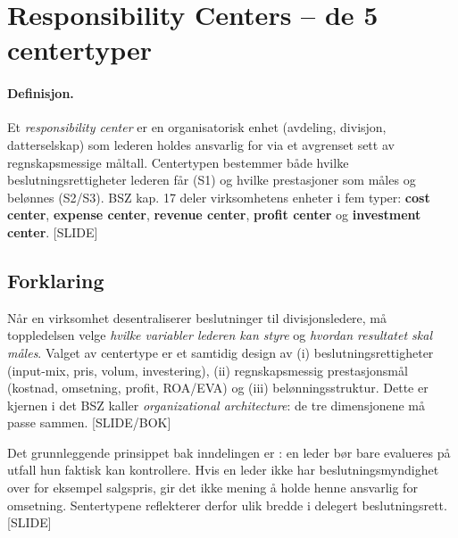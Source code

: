 \section{Responsibility Centers -- de 5 centertyper}\label{thr:responsibility-centers}

\paragraph{Definisjon.} Et \emph{responsibility center} er en organisatorisk enhet (avdeling, divisjon, datterselskap) som lederen holdes ansvarlig for via et avgrenset sett av regnskapsmessige måltall. Centertypen bestemmer både hvilke beslutningsrettigheter lederen får (S1) og hvilke prestasjoner som måles og belønnes (S2/S3). BSZ kap. 17 deler virksomhetens enheter i fem typer: \textbf{cost center}, \textbf{expense center}, \textbf{revenue center}, \textbf{profit center} og \textbf{investment center}. [SLIDE]

\subsection*{Forklaring}

Når en virksomhet desentraliserer beslutninger til divisjonsledere, må toppledelsen velge \emph{hvilke variabler lederen kan styre} og \emph{hvordan resultatet skal måles}. Valget av centertype er et samtidig design av (i) beslutningsrettigheter (input-mix, pris, volum, investering), (ii) regnskapsmessig prestasjonsmål (kostnad, omsetning, profit, ROA/EVA) og (iii) belønningsstruktur. Dette er kjernen i det BSZ kaller \emph{organizational architecture}: de tre dimensjonene må passe sammen. [SLIDE/BOK]

Det grunnleggende prinsippet bak inndelingen er : en leder bør bare evalueres på utfall hun faktisk kan kontrollere. Hvis en leder ikke har beslutningsmyndighet over for eksempel salgspris, gir det ikke mening å holde henne ansvarlig for omsetning. Sentertypene reflekterer derfor ulik bredde i delegert beslutningsrett. [SLIDE]

